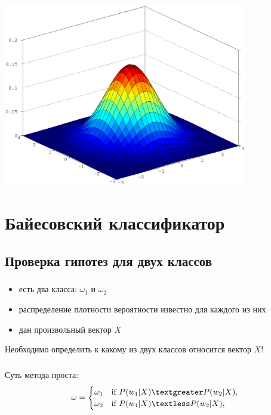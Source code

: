 \documentclass{beamer}
\begin{document}
\begin{frame}
  \frametitle{\insertsection}
  \framesubtitle{\insertsubsection}
  \includegraphics[width=0.8\textwidth]{normal.eps}
\end{frame}

\section{Байесовский классификатор}
\subsection{Проверка гипотез для двух классов}

\begin{frame}
  \frametitle{\insertsection}
  \framesubtitle{\insertsubsection}

  \begin{itemize}
    \item есть два класса: $\omega_1$ и $\omega_2$ \pause
    \item распределение плотности вероятности известно для каждого из них \pause
    \item дан произвольный вектор $X$
  \end{itemize}
  Необходимо определить к какому из двух классов относится вектор $X$!

\end{frame}

\begin{frame}
  \frametitle{\insertsection}
  \framesubtitle{\insertsubsection}
  Суть метода проста:
  \begin{equation*}
    \omega =
    \begin{cases}
      \omega_1 & \text{if } P(w_1 | X) \textgreater P(w_2 | X),\\
      \omega_2 & \text{if } P(w_1 | X) \textless P(w_2 | X),
    \end{cases}
  \end{equation*}
\end{frame}
\end{document}
